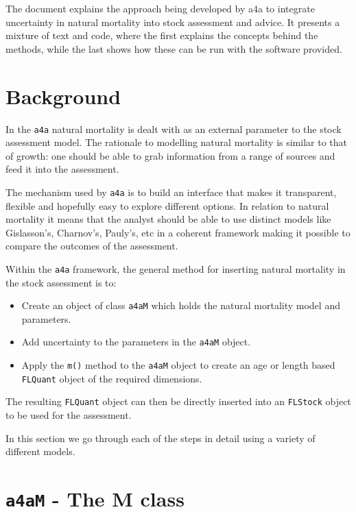 \documentclass[
]{book}
\providecommand{\tightlist}{%
  \setlength{\itemsep}{0pt}\setlength{\parskip}{0pt}}
\begin{document}
The document explains the approach being developed by a4a to integrate uncertainty in natural mortality into stock assessment and advice. It presents a mixture of text and code, where the first explains the concepts behind the methods, while the last shows how these can be run with the software provided.

\hypertarget{background}{%
\section{Background}\label{background}}

In the \texttt{a4a} natural mortality is dealt with as an external parameter to the stock assessment model. The rationale to modelling natural mortality is similar to that of growth: one should be able to grab information from a range of sources and feed it into the assessment.

The mechanism used by \texttt{a4a} is to build an interface that makes it transparent, flexible and hopefully easy to explore different options. In relation to natural mortality it means that the analyst should be able to use distinct models like Gislasson's, Charnov's, Pauly's, etc in a coherent framework making it possible to compare the outcomes of the assessment.

Within the \texttt{a4a} framework, the general method for inserting natural mortality in the stock assessment is to:

\begin{itemize}
\tightlist
\item
  Create an object of class \texttt{a4aM} which holds the natural mortality model and parameters.
\item
  Add uncertainty to the parameters in the \texttt{a4aM} object.
\item
  Apply the \texttt{m()} method to the \texttt{a4aM} object to create an age or length based \texttt{FLQuant} object of the required dimensions.
\end{itemize}

The resulting \texttt{FLQuant} object can then be directly inserted into an \texttt{FLStock} object to be used for the assessment.

In this section we go through each of the steps in detail using a variety of different models.

\hypertarget{a4am---the-m-class}{%
\section{\texorpdfstring{\texttt{a4aM} - The M class}{a4aM - The M class}}\label{a4am---the-m-class}}
\end{document}

